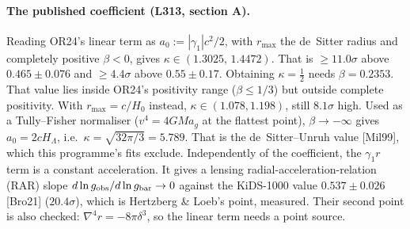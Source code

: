 \documentclass[10pt]{article}
\begin{document}
\paragraph{The published coefficient (L313, section A).}
Reading OR24's linear term as $a_0:=|\gamma_1|c^2/2$, with $r_{\max}$ the de~Sitter radius and completely positive $\beta<0$, gives $\kappa\in(1.3025,\,1.4472)$. That is $\geq11.0\sigma$ above $0.465\pm0.076$ and $\geq4.4\sigma$ above $0.55\pm0.17$.
Obtaining $\kappa=\tfrac12$ needs $\beta=0.2353$. That value lies inside OR24's positivity range ($\beta\leq1/3$) but outside complete positivity.
With $r_{\max}=c/H_0$ instead, $\kappa\in(1.078,1.198)$, still $8.1\sigma$ high.
Used as a Tully--Fisher normaliser ($v^4=4GMa_g$ at the flattest point), $\beta\to-\infty$ gives $a_0=2cH_\Lambda$, i.e.\ $\kappa=\sqrt{32\pi/3}=5.789$. That is the de~Sitter--Unruh value [Mil99], which this programme's fits exclude.
Independently of the coefficient, the $\gamma_1 r$ term is a constant acceleration. It gives a lensing radial-acceleration-relation (RAR) slope $d\ln g_{\rm obs}/d\ln g_{\rm bar}\to0$ against the KiDS-1000 value $0.537\pm0.026$ [Bro21] ($20.4\sigma$), which is Hertzberg \& Loeb's point, measured. Their second point is also checked: $\nabla^4 r=-8\pi\delta^3$, so the linear term needs a point source.
\end{document}
